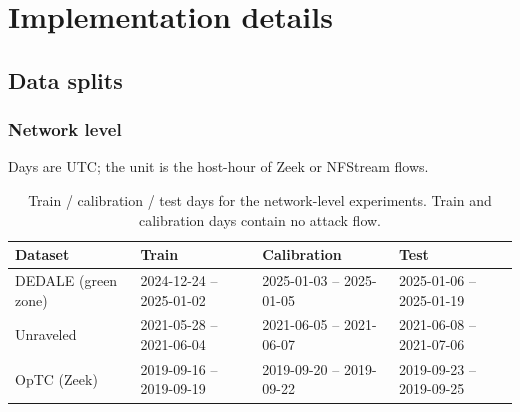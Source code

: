 \section{Implementation details}\label{app:impl}
\subsection{Data splits}
\subsubsection{Network level}
Days are UTC; the unit is the host-hour of Zeek or NFStream flows.
\begin{table}[!htbp]\centering\footnotesize\setlength{\tabcolsep}{3pt}
\caption{Train / calibration / test days for the network-level experiments. Train and calibration days contain no attack flow.}
\begin{tabularx}{\textwidth}{@{}lYYY@{}}
\toprule
Dataset & Train & Calibration & Test \\
\midrule
DEDALE (green zone) & 2024-12-24 -- 2025-01-02 & 2025-01-03 -- 2025-01-05 & 2025-01-06 -- 2025-01-19 \\
Unraveled & 2021-05-28 -- 2021-06-04 & 2021-06-05 -- 2021-06-07 & 2021-06-08 -- 2021-07-06 \\
OpTC (Zeek) & 2019-09-16 -- 2019-09-19 & 2019-09-20 -- 2019-09-22 & 2019-09-23 -- 2019-09-25 \\
\bottomrule
\end{tabularx}
\end{table}
